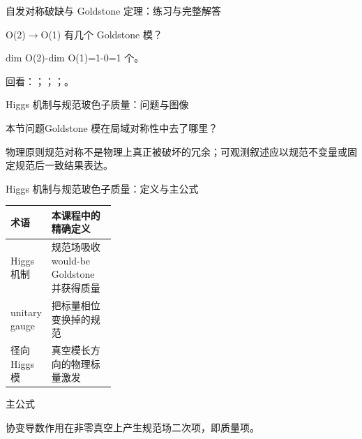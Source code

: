 \begin{frame}[t]{自发对称破缺与 Goldstone 定理：练习与完整解答}
\footnotesize
\begin{block}{}O(2)\ensuremath{\rightarrow}O(1) 有几个 Goldstone 模？\end{block}
\begin{exampleblock}{}dim O(2)-dim O(1)=1-0=1 个。\end{exampleblock}
\vfill
\scriptsize 回看：；；；。
\end{frame}

\begin{frame}[t]{Higgs 机制与规范玻色子质量：问题与图像}
\footnotesize
\begin{block}{本节问题}Goldstone 模在局域对称性中去了哪里？\end{block}
\begin{block}{物理原则}\quad 规范对称不是物理上真正被破坏的冗余；可观测叙述应以规范不变量或固定规范后一致结果表达。\end{block}
\end{frame}

\begin{frame}[t]{Higgs 机制与规范玻色子质量：定义与主公式}
\footnotesize\begin{tabularx}{\linewidth}{p{0.30\linewidth}Y}
\toprule 术语 & 本课程中的精确定义\\\midrule
{} Higgs 机制 & 规范场吸收 would-be Goldstone 并获得质量\\
 unitary gauge & 把标量相位变换掉的规范\\
 径向 Higgs 模 & 真空模长方向的物理标量激发\\
\bottomrule\end{tabularx}\vspace{0.15cm}
\begin{block}{ 主公式}\centering{}\end{block}
协变导数作用在非零真空上产生规范场二次项，即质量项。
\end{frame}

